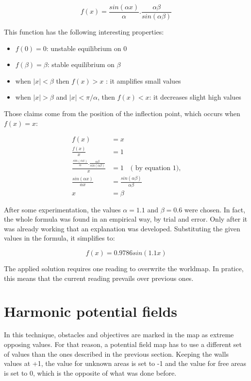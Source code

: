 \documentclass[a4paper,twocolumn]{article}
\begin{document}
    \begin{equation}
        f(x) = \frac{sin(\alpha x)}{\alpha} . \frac{\alpha\beta}{sin(\alpha\beta)}
    \end{equation}

    This function has the following interesting properties: 
    \begin{itemize}
        \item $f(0) = 0$: unstable equilibrium on 0
        \item $f(\beta) = \beta$: stable equilibrium on $\beta$
        \item when $|x| < \beta$ then $f(x) > x$ : it amplifies small values
        \item when $|x| > \beta$ and $|x|< \pi/\alpha$, then $f(x) < x $: it decreases slight high values
    \end{itemize}

    Those claims come from the position of the inflection point, which occurs when $f(x) = x$:

    \begin{align}
        f(x) &= x \\
        \frac{f(x)}{x} &= 1 \nonumber\\
        \frac{\frac{sin(\alpha x)}{\alpha} . \frac{\alpha\beta}{sin(\alpha\beta)}}{x} &= 1 \quad\text{( by equation 1),}  \nonumber\\
        \frac{sin(\alpha x)}{\alpha x} &= \frac{sin(\alpha\beta)}
        {\alpha\beta} \nonumber\\
        x &= \beta
    \end{align}

    After some experimentation, the values $\alpha = 1.1$ and $\beta = 0.6$ were chosen. In fact, the whole formula was found in an empirical way, by trial and error. Only after it was already working that an explanation was developed. Substituting the given values in the formula, it simplifies to:
    
    \begin{equation}
        f(x) = 0.9786 sin(1.1 x)
    \end{equation}

    The applied solution requires one reading to overwrite the worldmap. In pratice, this means that the current reading prevails over previous ones. 
    
\section{Harmonic potential fields}
    In this technique, obstacles and objectives are marked in the map as extreme opposing values. For that reason, a potential field map has to use a different set of values than the ones described in the previous section. Keeping the walls values at +1, the value for unknown areas is set to -1 and the value for free areas is set to 0, which is the opposite of what was done before.
\end{document}
